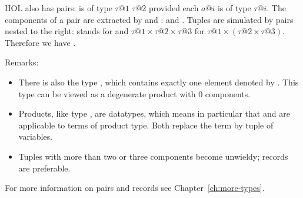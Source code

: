 %
\begin{isabellebody}%
\def\isabellecontext{pairs}%
%
\begin{isamarkuptext}%
\label{sec:pairs}
HOL also has pairs:  is of type $\tau@1$
 $\tau@2$ provided each $a@i$ is of type
$\tau@i$. The components of a pair are extracted by  and
:
  and . Tuples
are simulated by pairs nested to the right:  stands
for  and $\tau@1 \times \tau@2 \times \tau@3$ for
$\tau@1 \times (\tau@2 \times \tau@3)$. Therefore we have
.

Remarks:
\begin{itemize}
\item
There is also the type , which contains exactly one
element denoted by . This type can be viewed
as a degenerate product with 0 components.
\item
Products, like type , are datatypes, which means
in particular that  and  are applicable to
terms of product type.
Both replace the term by tuple of variables.
\item
Tuples with more than two or three components become unwieldy;
records are preferable.
\end{itemize}
For more information on pairs and records see Chapter~\ref{ch:more-types}.%
\end{isamarkuptext}%
\end{isabellebody}%
